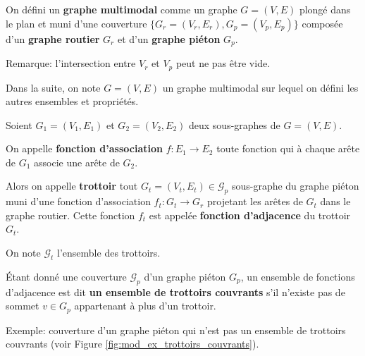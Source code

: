 \begin{definition}
    On défini un \textbf{graphe multimodal} comme un graphe $G = (V,E)$ plongé dans le plan et muni d'une couverture $\{G_r=(V_r, E_r), G_p = (V_p, E_p)\}$ composée d'un \textbf{graphe routier} $G_r$ et d'un \textbf{graphe piéton} $G_p$.

    Remarque: l'intersection entre $V_r$ et $V_p$ peut ne pas être vide.

    Dans la suite, on note $G = (V,E)$ un graphe multimodal sur lequel on défini les autres ensembles et propriétés.
\end{definition}

\begin{definition}
    Soient $G_1=(V_1, E_1)$ et $G_2=(V_2, E_2)$ deux sous-graphes de $G=(V, E)$.
    
    On appelle \textbf{fonction d'association} $f: E_1 \rightarrow E_2$ toute fonction qui à chaque arête de $G_1$ associe une arête de $G_2$.
\end{definition}

\begin{definition}
    Alors on appelle \textbf{trottoir} tout $G_t = (V_t, E_t)\in \mathcal{G}_p$ sous-graphe du graphe piéton muni d'une fonction d'association $f_t: G_t \rightarrow G_r$ projetant les arêtes de $G_t$ dans le graphe routier. Cette fonction $f_t$ est appelée \textbf{fonction d'adjacence} du trottoir $G_t$.

    On note $\mathcal{G}_t$ l'ensemble des trottoirs.
\end{definition}

\begin{definition}
    Étant donné une couverture $\mathcal{G}_p$ d'un graphe piéton $G_p$, un ensemble de fonctions d'adjacence est dit \textbf{un ensemble de trottoirs couvrants} s'il n'existe pas de sommet $v \in G_p$ appartenant à plus d'un trottoir.

    Exemple: couverture d'un graphe piéton qui n'est pas un ensemble de trottoirs couvrants (voir Figure \ref{fig:mod_ex_trottoirs_couvrants}).
\end{definition}

